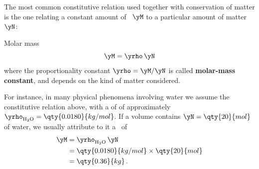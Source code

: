 \label{nsec:matter_constitutive}

\label{nsec:const_matter_mass}

The most common constitutive relation used  together with conservation of matter is the one relating a constant amount of \masse\ $\yM$ to a particular amount of matter $\yN$:
\begin{definition}{Molar mass}
  \begin{equation}
    \label{neq:molar_mass}
    \yM = \yrho\, \yN
  \end{equation}
  where the proportionality constant $\yrho=\yM/\yN$ is called \textbf{molar-mass constant}, and depends on the kind of matter considered.
\end{definition}

For instance, in many physical phenomena involving water we assume the constitutive relation above, with a
of  of approximately $\yrho_{\mathrm{H_2O}}=\qty{0.0180}{kg/mol}$. If a volume contains $\yN=\qty{20}{mol}$ of water, we usually attribute to it a \masse\ of
\begin{equation*}
  \begin{split}
    \yM &= \yrho_{\mathrm{H_2O}}\, \yN
    \\
    &=\qty{0.0180}{kg/mol} \times \qty{20}{mol}
    \\
    &= \qty{0.36}{kg}\,.
  \end{split}
\end{equation*}

